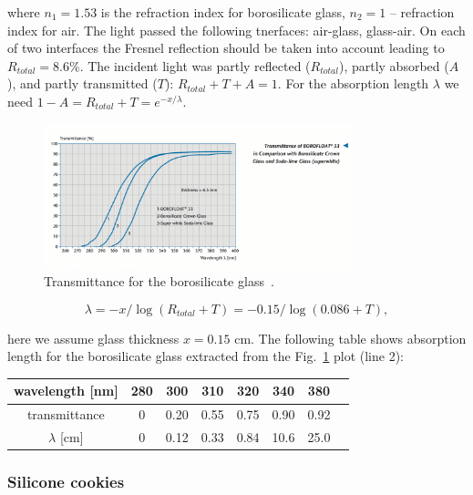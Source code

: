 \noindent where $n_1 = 1.53$ is the refraction index for borosilicate glass, $n_2 = 1$ -- refraction index for air. The light passed the following tnerfaces: air-glass, glass-air. On each of two interfaces the Fresnel reflection should be taken into account leading to $R_{total} = 8.6\%$. The incident light was partly reflected ($R_{total}$), partly absorbed ($A$), and partly transmitted ($T$): $ R_{total} + T + A = 1$. For the absorption length $\lambda$ we need $1 - A = R_{total} + T = e^{-x/\lambda}$. 

\begin{figure}[htb]
\centering
\includegraphics[angle=0,width=0.8\textwidth]{pics/glass.png}
\caption{\label{pic:gla}
Transmittance for the borosilicate glass~\cite{borospec}.
}
\end{figure}

\begin{equation}
\lambda = -x/\log(R_{total}+T) = -0.15/\log(0.086+T),
\label{eq:lam}
\end{equation}

\noindent here we assume glass thickness $x = 0.15$ cm. The following table shows absorption length for the borosilicate glass extracted from the Fig.~\ref{pic:gla} plot (line 2):

\begin{center}
\begin{tabular}{| c | c | c | c | c | c | c | c |}
\hline
wavelength [nm] & 280 & 300 & 310 & 320 & 340 & 380 \\
\hline
transmittance & 0 & 0.20 & 0.55 & 0.75 & 0.90 & 0.92 \\
\hline
$\lambda$ [cm] & 0 & 0.12 & 0.33 & 0.84 & 10.6 & 25.0 \\
\hline
\end{tabular}
\end{center}

\subsubsection*{Silicone cookies}

